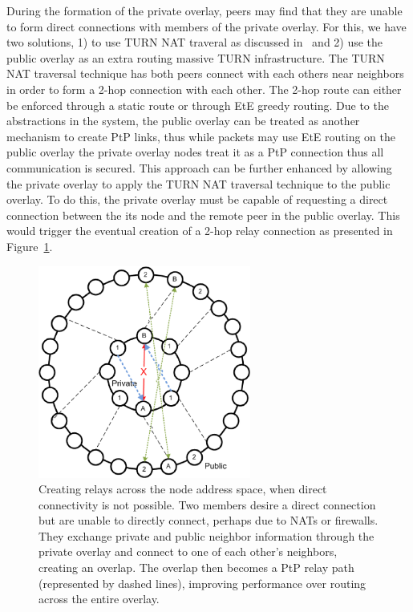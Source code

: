 \documentclass[conference]{IEEEtran}
\begin{document}
During the formation of the private overlay, peers may find that they are
unable to form direct connections with members of the private overlay.  For
this, we have two solutions, 1) to use TURN NAT traveral as discussed
in~\cite{nsdi10} and 2) use the public overlay as an extra routing massive TURN
infrastructure.  The TURN NAT traversal technique has both peers connect with
each others near neighbors in order to form a 2-hop connection with each other.
The 2-hop route can either be enforced through a static route or through EtE
greedy routing.  Due to the abstractions in the system, the public overlay can
be treated as another mechanism to create PtP links, thus while packets may use
EtE routing on the public overlay the private overlay nodes treat it as a PtP
connection thus all communication is secured.  This approach can be further
enhanced by allowing the private overlay to apply the TURN NAT traversal
technique to the public overlay.  To do this, the private overlay must be
capable of requesting a direct connection between the its node and the remote
peer in the public overlay.  This would trigger the eventual creation of a 2-hop
relay connection as presented in Figure~\ref{fig:overlay_relay}.

\begin{figure}[h]
\centering
\includegraphics[width=2.75in]{subring_tunnel.eps}
\caption{Creating relays across the node address space, when direct
connectivity is not possible.  Two members desire a direct connection but are
unable to directly connect, perhaps due to NATs or firewalls.  They exchange
private and public neighbor information through the private overlay and connect
to one of each other's neighbors, creating an overlap.  The overlap then
becomes a PtP relay path (represented by dashed lines), improving performance
over routing across the entire overlay.}
\label{fig:overlay_relay}
\end{figure}
\end{document}
